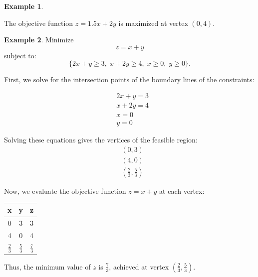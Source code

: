 \documentclass[oneside,11pt,dvipsnames]{book}
\numberwithin{equation}{section}
\theoremstyle{definition}
\newtheorem{example}{Example}[section]
\theoremstyle{remark}
\begin{document}
\begin{example}
\begin{center}
\end{center}

The objective function $z = 1.5x+2y$ is maximized at vertex $(0,4)$.

\end{example}



\begin{example}\label{ex:lp-example2}
Minimize
\[
z = x + y
\]
subject to:
\[
\{2x + y \ge 3,\; x + 2y \ge 4,\; x \ge 0,\; y \ge 0\}.
\]

First, we solve for the intersection points of the boundary lines of the constraints:

\[
\begin{aligned}
& 2x + y = 3 \\
& x + 2y = 4 \\
& x = 0 \\
& y = 0
\end{aligned}
\]

Solving these equations gives the vertices of the feasible region:
\[
\begin{aligned}
& (0,3) \\
& (4, 0) \\
& (\frac{2}{3}, \frac{5}{3})
\end{aligned}
\]

Now, we evaluate the objective function $z = x + y$ at each vertex:

\begin{center}
\begin{tabular}{ccc}
\hline
x & y & z \\
\hline
0 & 3 & 3 \\
4 & 0 & 4 \\
$\frac{2}{3}$ & $\frac{5}{3}$ & $\frac{7}{3}$ \\
\hline
\end{tabular}
\end{center}

Thus, the minimum value of $z$ is $\frac{7}{3}$, achieved at vertex $\left(\frac{2}{3}, \frac{5}{3}\right)$.


\end{example}
\end{document}
